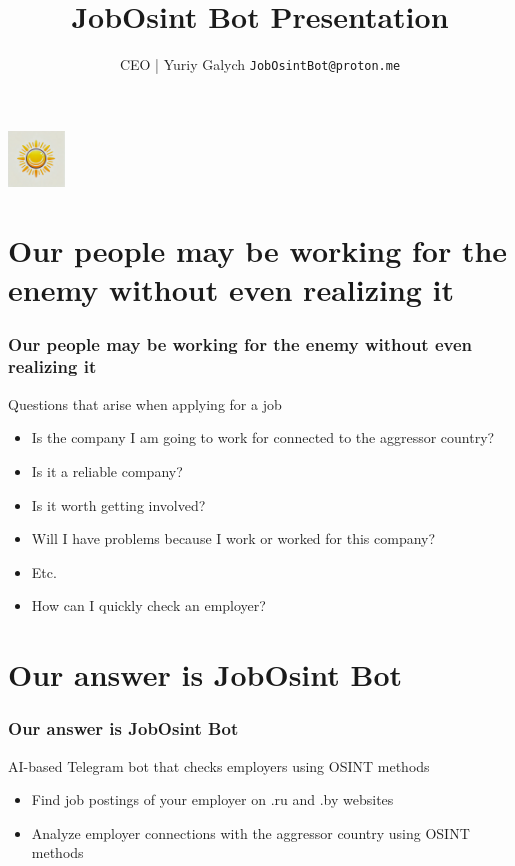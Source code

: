 \documentclass[aspectratio=169]{beamer}
\title{JobOsint Bot Presentation}
\author{CEO | Yuriy Galych \newline \texttt{JobOsintBot@proton.me}}
\date{} %
\begin{document}
\begin{frame}
    \centering
    \includegraphics[height=1.5cm]{logo.png} %
    \vspace{1cm}
    \titlepage
\end{frame}

\section{Our people may be working for the enemy without even realizing it}

\begin{frame}
    \frametitle{Our people may be working for the enemy without even realizing it}
    
    \begin{block}{Questions that arise when applying for a job}
        \begin{itemize}
            \item Is the company I am going to work for connected to the aggressor country?
            \item Is it a reliable company?
            \item Is it worth getting involved?
            \item Will I have problems because I work or worked for this company?
            \item Etc.
            \item How can I quickly check an employer?
        \end{itemize}
    \end{block}
    
\end{frame}

\section{Our answer is JobOsint Bot}

\begin{frame}
    \frametitle{Our answer is JobOsint Bot}
    
    \begin{block}{AI-based Telegram bot that checks employers using OSINT methods}
        \begin{itemize}
            \item Find job postings of your employer on .ru and .by websites
            \item Analyze employer connections with the aggressor country using OSINT methods
        \end{itemize}
    \end{block}
    
\end{frame}
\end{document}
